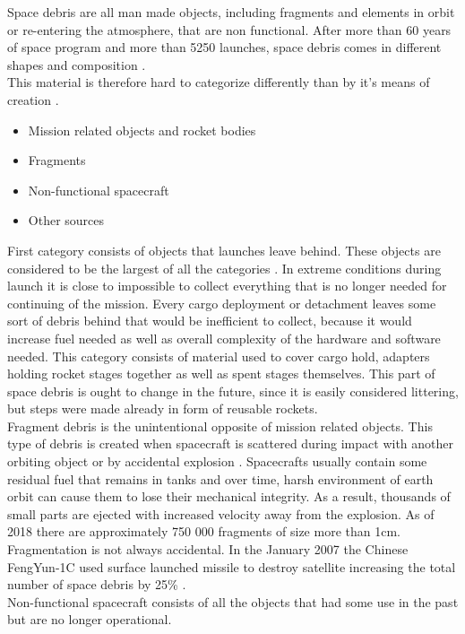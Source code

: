 \documentclass[12pt, a4paper, oneside]{book}
\begin{document}
Space debris are all man made objects, including fragments and elements in orbit or re-entering the atmosphere, that are non functional.
After more than 60 years of space program and more than 5250 launches, space debris comes in different shapes and composition \cite{esa_debris_numbers}.\\
This material is therefore hard to categorize differently than by it's means of creation \cite{klinkrad}. \\
\begin{itemize}
    \item Mission related objects and rocket bodies
    \item Fragments
    \item Non-functional spacecraft
    \item Other sources
\end{itemize}
    First category consists of objects that launches leave behind.
These objects are considered to be the largest of all the categories \cite{fmpi_cu}.
In extreme conditions during launch it is close to impossible to collect everything that is no longer needed for continuing of the mission.
Every cargo deployment or detachment leaves some sort of debris behind that would be inefficient to collect, because it would increase fuel needed as well as overall complexity of the hardware and software needed.
This category consists of material used to cover cargo hold, adapters holding rocket stages together as well as spent stages themselves.
This part of space debris is ought to change in the future, since it is easily considered littering, but steps were made already in form of reusable rockets.\\
    Fragment debris is the unintentional opposite of mission related objects.
This type of debris is created when spacecraft is scattered during impact with another orbiting object or by accidental explosion \cite{agapov}.
Spacecrafts usually contain some residual fuel that remains in tanks and over time, harsh environment of earth orbit can cause them to lose their mechanical integrity.
As a result, thousands of small parts are ejected with increased velocity away from the explosion.
As of 2018 there are approximately 750 000 fragments of size more than 1cm.
Fragmentation is not always accidental. In the January 2007 the Chinese FengYun-1C used surface launched missile to destroy satellite increasing the total number of space debris by 25\% \cite{lambert}.\\
    Non-functional spacecraft consists of all the objects that had some use in the past but are no longer operational.
\end{document}
